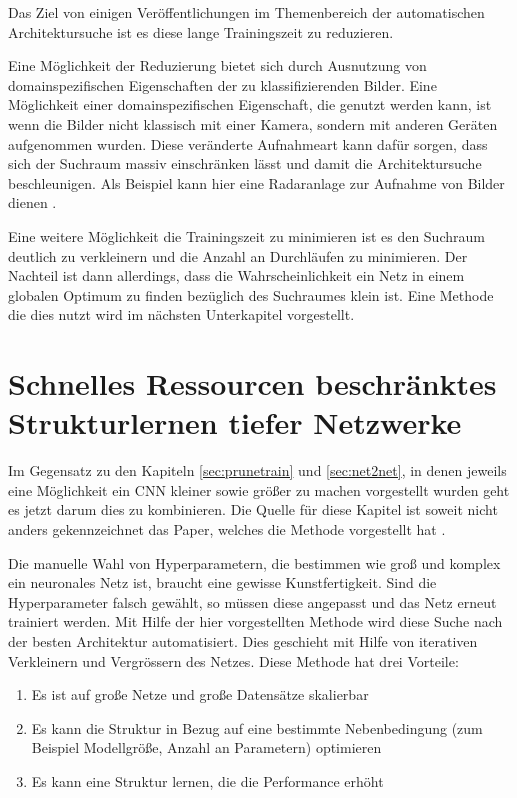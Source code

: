 Das Ziel von einigen Veröffentlichungen im Themenbereich der automatischen Architektursuche ist es diese lange Trainingszeit zu reduzieren.

Eine Möglichkeit der Reduzierung bietet sich durch Ausnutzung von domainspezifischen Eigenschaften der zu klassifizierenden Bilder. Eine Möglichkeit einer domainspezifischen Eigenschaft, die genutzt werden kann, ist wenn die Bilder nicht klassisch mit einer Kamera, sondern mit anderen Geräten aufgenommen wurden. Diese veränderte Aufnahmeart kann dafür sorgen, dass sich der Suchraum massiv einschränken lässt und damit die Architektursuche beschleunigen.
Als Beispiel kann hier eine Radaranlage zur Aufnahme von Bilder dienen \cite{polsar}.


Eine weitere Möglichkeit die Trainingszeit zu minimieren ist es den Suchraum deutlich zu verkleinern und die Anzahl an Durchläufen zu minimieren. Der Nachteil ist dann allerdings, dass die Wahrscheinlichkeit ein Netz in einem globalen Optimum zu finden bezüglich des Suchraumes klein ist. Eine Methode die dies nutzt wird im nächsten Unterkapitel vorgestellt.
\color{black}


\section{Schnelles Ressourcen beschränktes Strukturlernen tiefer Netzwerke}\label{sec:morphnet}
Im Gegensatz zu den Kapiteln \ref{sec:prunetrain} und \ref{sec:net2net}, in denen jeweils eine Möglichkeit ein CNN kleiner sowie größer zu machen vorgestellt wurden geht es jetzt darum dies zu kombinieren. Die Quelle für diese Kapitel ist soweit nicht anders gekennzeichnet das Paper, welches die Methode vorgestellt hat \cite{morphnet}.

Die manuelle Wahl von Hyperparametern, die bestimmen wie groß und komplex ein neuronales Netz ist, braucht eine gewisse Kunstfertigkeit. Sind die Hyperparameter falsch gewählt, so müssen diese angepasst und das Netz erneut trainiert werden. Mit Hilfe der hier vorgestellten Methode wird diese Suche nach der besten Architektur automatisiert. Dies geschieht mit Hilfe von iterativen Verkleinern und Vergrössern des Netzes. Diese Methode hat drei Vorteile:
\begin{enumerate}
 \item Es ist auf große Netze und große Datensätze skalierbar
 \item Es kann die Struktur in Bezug auf eine bestimmte Nebenbedingung (zum Beispiel Modellgröße, Anzahl an Parametern) optimieren
 \item Es kann eine Struktur lernen, die die Performance erhöht
\end{enumerate}

